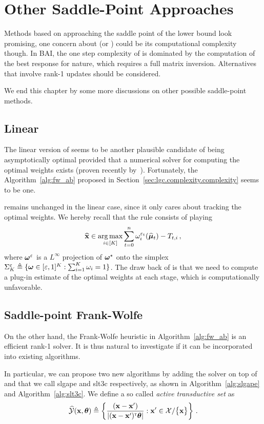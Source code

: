 \section{Other Saddle-Point Approaches}\label{sec:lgc.sp}

Methods based on approaching the saddle point of the lower bound look promising, one concern about \LG{} (or \LGC{}) could be its computational complexity though. In BAI, the one step complexity of \LG{} is dominated by the computation of the best response for nature, which requires a full matrix inversion. Alternatives that involve rank-1 updates should be considered.

We end this chapter by some more discussions on other possible saddle-point methods.

\subsection{Linear \texorpdfstring{\Track{}}{}}

The linear version of \Track seems to be another plausible candidate of being asymptotically optimal provided that a numerical solver for computing the optimal weights exists (proven recently by~\citealt{jedra2020linear}). Fortunately, the Algorithm~\ref{alg:fw_ab} proposed in Section~\ref{sec:lgc.complexity.complexity} seems to be one.

\Track remains unchanged in the linear case, since it only cares about tracking the optimal weights. We hereby recall that the \CT rule consists of playing
\[
    \widehat{{\bf x}} \in \operatorname*{arg\,max}_{i\in[K]} \sum_{t=0}^n \omega_i^{\varepsilon_t}(\widehat{{\boldsymbol \mu}}_t)-T_{t,i}\,,
\]
where ${\boldsymbol \omega}^\varepsilon$ is a $L^\infty$ projection of ${\boldsymbol \omega}^\star$ onto the simplex $\Sigma_K^\varepsilon \triangleq \{{\boldsymbol \omega}\in [\varepsilon,1]^K : \sum_{i=1}^K \omega_i = 1\}$. The draw back of \Track is that we need to compute a plug-in estimate of the optimal weights at each stage, which is computationally unfavorable.

\subsection{Saddle-point Frank-Wolfe}
On the other hand, the Frank-Wolfe heuristic in Algorithm~\ref{alg:fw_ab} is an efficient rank-1 solver. It is thus natural to investigate if it can be incorporated into existing algorithms. 

In particular, we can propose two new algorithms by adding the solver on top of \LGapE{} and \LTCC that we call \gls{slgape} and \gls{slt3c} respectively, as shown in Algorithm~\ref{alg:slgape} and Algorithm~\ref{alg:slt3c}. We define a so called \emph{active transductive set} as
\begin{align}\label{def:active_transductive}
    \widehat{\mathcal{Y}}({\bf x},{\boldsymbol \theta}) \triangleq \left\{ \frac{({\bf x}- {\bf x}')}{\left|({\bf x}-{\bf x}')^\mathsf{\scriptscriptstyle T}{\boldsymbol \theta}\right|}: {\bf x}'\in\mathcal{X}/\big\{{\bf x}\big\}  \right\}\,.
\end{align}

